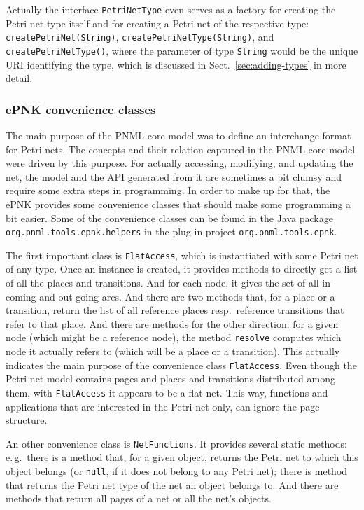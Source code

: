 Actually the interface {\tt PetriNetType} even serves as a factory for creating
the Petri net type itself and for creating a Petri net of the respective type:
{\tt createPetriNet(String)},  {\tt createPetriNetType(String)}, and
{\tt createPetriNetType()}, where the parameter of type {\tt String} would be
the unique URI identifying the type,%
which is discussed in Sect.~\ref{sec:adding-types} in more detail.  
  
\subsubsection{ePNK convenience classes}
\label{subsubsec:developer:functitions:utilities:convenience}

The main purpose of the PNML core model was to define an interchange format
for Petri nets. The concepts and their relation captured
in the PNML core model were driven by this purpose. For actually accessing,
modifying, and updating the net, the model and the API generated from it
are sometimes a bit clumsy and require some extra steps in programming.
In order to make up for that, the ePNK provides some convenience
classes that should make some programming a bit easier. Some of the
convenience classes can be found in the Java package
{\tt org.pnml.tools.epnk.helpers} in the plug-in project
{\tt org.pnml.tools.epnk}.

The first important class is {\tt FlatAccess},%
which is instantiated with some Petri net of any type. Once an instance is
created, it provides methods to directly get a list of all the places and
transitions. And for each node, it gives the set of all in-coming and out-going
arcs. And there are two methods that, for a place or a transition, return the
list of all reference places resp.\ reference transitions that refer to that place.
And there are methods for the other direction: for a given node
(which might be a reference node), the method {\tt resolve} computes
which node it actually refers to (which will be a place or a transition).
This actually indicates the main purpose of the convenience class
{\tt FlatAccess}. Even though the Petri net model contains pages and
places and transitions distributed among them, with {\tt FlatAccess}
it appears to be a flat net. This way, functions and applications that
are interested in the Petri net only, can ignore the page structure.

An other convenience class is {\tt NetFunctions}.%
It provides several static methods: e.\,g.\ there is a method that, for a
given object, returns the Petri net to which this object belongs (or {\tt null},
if it does not belong to any Petri  net); there is method that returns the Petri net
type of the net an object belongs to. And there are methods that return
all pages of a net or all the net's objects. 

